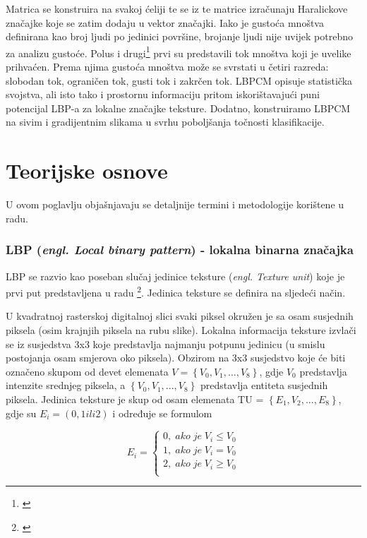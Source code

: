 \documentclass[times, utf8, zavrsni]{fer}
\begin{document}
Matrica se konstruira na svakoj ćeliji te se iz te matrice izračunaju 
Haralickove značajke koje se zatim dodaju u vektor značajki. Iako je 
gustoća mnoštva definirana kao broj ljudi po jedinici površine, 
brojanje ljudi nije uvijek potrebno za analizu gustoće. Polus i 
drugi\footnote{\cite{polus}} prvi su predstavili tok mnoštva koji je uvelike prihvaćen. 
Prema njima gustoća mnoštva može se svrstati u četiri razreda: 
slobodan tok, ograničen tok, gusti tok i zakrčen tok. 
LBPCM opisuje statistička svojstva, ali isto tako i prostornu 
informaciju pritom iskorištavajući puni potencijal LBP-a za 
lokalne značajke teksture. Dodatno, konstruiramo LBPCM na sivim i 
gradijentnim slikama u svrhu poboljšanja točnosti klasifikacije.


\chapter{Teorijske osnove}
U ovom poglavlju objašnjavaju se detaljnije termini i metodologije korištene u radu.

\subsection{LBP (\textit{engl. Local binary pattern}) - lokalna binarna značajka}

LBP se razvio kao poseban slučaj jedinice teksture (\textit{engl. Texture unit})
koje je prvi put predstavljena u radu \footnote{\cite{dong}}.
Jedinica teksture se definira na sljedeći način. 

\bigbreak

U kvadratnoj rasterskoj digitalnoj slici svaki piksel okružen je sa 
osam susjednih piksela (osim krajnjih piksela na rubu slike). 
Lokalna informacija teksture izvlači se iz susjedstva 3x3 koje 
predstavlja najmanju potpunu jedinicu (u smislu postojanja osam 
smjerova oko piksela). Obzirom na 3x3 susjedstvo koje će biti 
označeno skupom od devet elemenata \(V = \left\{V_0, V_1,..., V_8\right\}\),
gdje \(V_0\) predstavlja intenzite srednjeg piksela, a 
\(\left\{V_0, V_1,..., V_8\right\}\) predstavlja entiteta susjednih piksela.
Jedinica teksture je skup od osam elemenata TU = \(\left\{E_1, V_2,..., E_8\right\}\),
gdje su \(E_i = (0,1 ili 2)\) i određuje se formulom

\[
E_i = \left\{
\begin{matrix}
0, \; ako \; je \; V_i \le V_0 \\
1, \; ako \; je \; V_i = V_0 \\
2, \; ako \; je \; V_i \ge V_0 \\
\end{matrix}
\right.
\]
\end{document}
